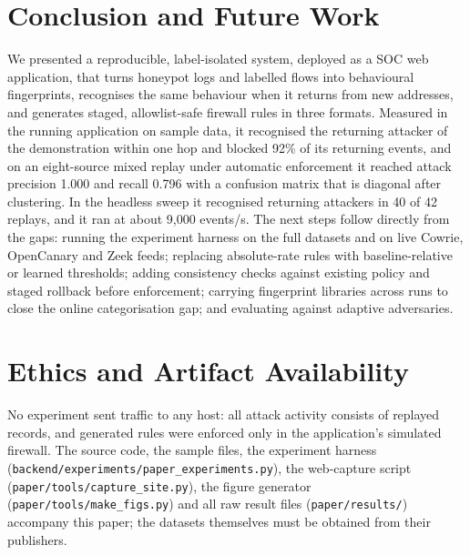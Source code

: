 \documentclass[conference]{IEEEtran}
\begin{document}
\section{Conclusion and Future Work}
We presented a reproducible, label-isolated system, deployed as a SOC web application, that turns honeypot logs and labelled flows into behavioural fingerprints, recognises the same behaviour when it returns from new addresses, and generates staged, allowlist-safe firewall rules in three formats. Measured in the running application on sample data, it recognised the returning attacker of the demonstration within one hop and blocked 92\% of its returning events, and on an eight-source mixed replay under automatic enforcement it reached attack precision 1.000 and recall 0.796 with a confusion matrix that is diagonal after clustering. In the headless sweep it recognised returning attackers in 40 of 42 replays, and it ran at about 9,000 events/s. The next steps follow directly from the gaps: running the experiment harness on the full datasets and on live Cowrie, OpenCanary and Zeek feeds; replacing absolute-rate rules with baseline-relative or learned thresholds; adding consistency checks against existing policy and staged rollback before enforcement; carrying fingerprint libraries across runs to close the online categorisation gap; and evaluating against adaptive adversaries.

\section*{Ethics and Artifact Availability}
No experiment sent traffic to any host: all attack activity consists of replayed records, and generated rules were enforced only in the application's simulated firewall. The source code, the sample files, the experiment harness (\texttt{backend/experiments/paper\_experiments.py}), the web-capture script (\texttt{paper/tools/capture\_site.py}), the figure generator (\texttt{paper/tools/make\_figs.py}) and all raw result files (\texttt{paper/results/}) accompany this paper; the datasets themselves must be obtained from their publishers.
\end{document}
